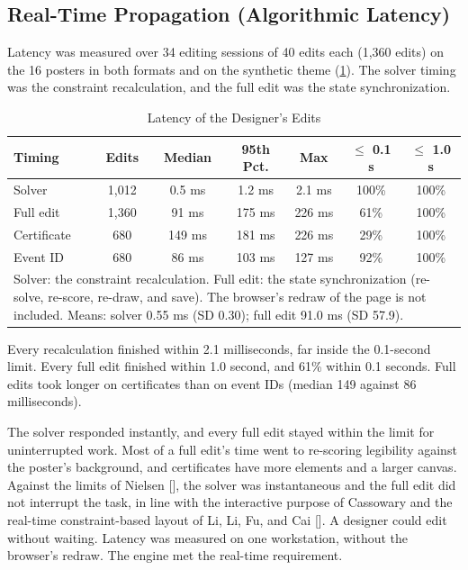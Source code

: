 \begin{refsection}
\clearpage
\subsection{Real-Time Propagation (Algorithmic Latency)}

Latency was measured over 34 editing sessions of 40 edits each (1,360 edits) on the 16 posters in both formats and on the synthetic theme (\ref{tab:latency}). The solver timing was the constraint recalculation, and the full edit was the state synchronization.

\begin{table}[!ht]
\centering
\caption{Latency of the Designer's Edits}
\label{tab:latency}
\begin{tabular}{l c c c c c c}
\hline
\textbf{Timing} & \textbf{Edits} & \textbf{Median} & \textbf{95th Pct.} & \textbf{Max} & \textbf{$\leq$ 0.1 s} & \textbf{$\leq$ 1.0 s} \\ \hline
Solver & 1,012 & 0.5 ms & 1.2 ms & 2.1 ms & 100\% & 100\% \\
Full edit & 1,360 & 91 ms & 175 ms & 226 ms & 61\% & 100\% \\
\quad Certificate & 680 & 149 ms & 181 ms & 226 ms & 29\% & 100\% \\
\quad Event ID & 680 & 86 ms & 103 ms & 127 ms & 92\% & 100\% \\ \hline
\multicolumn{7}{p{0.80\textwidth}}{\footnotesize Solver: the constraint recalculation. Full edit: the state synchronization (re-solve, re-score, re-draw, and save). The browser's redraw of the page is not included. Means: solver 0.55 ms (SD 0.30); full edit 91.0 ms (SD 57.9).}
\end{tabular}
\end{table}

Every recalculation finished within 2.1 milliseconds, far inside the 0.1-second limit. Every full edit finished within 1.0 second, and 61\% within 0.1 seconds. Full edits took longer on certificates than on event IDs (median 149 against 86 milliseconds).

The solver responded instantly, and every full edit stayed within the limit for uninterrupted work. Most of a full edit's time went to re-scoring legibility against the poster's background, and certificates have more elements and a larger canvas. Against the limits of Nielsen [\citeyear{nielsen1993usability}], the solver was instantaneous and the full edit did not interrupt the task, in line with the interactive purpose of Cassowary \cite{Badros2001Cassowary} and the real-time constraint-based layout of Li, Li, Fu, and Cai [\citeyear{Li2024SMT}]. A designer could edit without waiting. Latency was measured on one workstation, without the browser's redraw. The engine met the real-time requirement.


\end{refsection}
